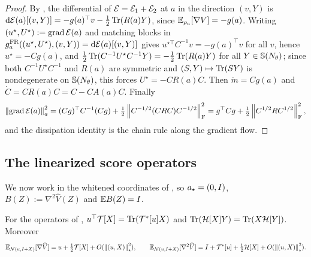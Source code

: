 \begin{proof}
By , the differential of $\mathcal{E}=\mathcal{E}_1+\mathcal{E}_2$ at $a$ in the direction
$(v,Y)$ is $\mathrm{d}\mathcal{E}(a)[(v,Y)]=-g(a)^\top v-\tfrac12\operatorname{Tr}(R(a)Y)$, since
$\mathbb{E}_{\rho_a}[\nabla V]=-g(a)$. Writing $(u^\star,U^\star):=\operatorname{grad}\mathcal{E}(a)$ and matching blocks in
$g_a^{\mathrm{FR}}((u^\star,U^\star),(v,Y))=\mathrm{d}\mathcal{E}(a)[(v,Y)]$ gives $u^{\star\top}C^{-1}v=-g(a)^\top v$
for all $v$, hence $u^\star=-Cg(a)$, and
$\tfrac12\operatorname{Tr}(C^{-1}U^\star C^{-1}Y)=-\tfrac12\operatorname{Tr}(R(a)Y)$ for all $Y\in\mathbb{S}(N_\theta)$; since
both $C^{-1}U^\star C^{-1}$ and $R(a)$ are symmetric and $(S,Y)\mapsto\operatorname{Tr}(SY)$ is nondegenerate
on $\mathbb{S}(N_\theta)$, this forces $U^\star=-CR(a)C$. Then $\dot m=Cg(a)$ and
$\dot C=CR(a)C=C-CA(a)C$. Finally
\[
    \left\lVert \operatorname{grad}\mathcal{E}(a)\right\rVert_a^2
    =(Cg)^\top C^{-1}(Cg)+\tfrac12\left\lVert C^{-1/2}(CRC)C^{-1/2}\right\rVert_{\mathrm{F}}^2
    =g^\top Cg+\tfrac12\left\lVert C^{1/2}RC^{1/2}\right\rVert_{\mathrm{F}}^2,
\]
and the dissipation identity is the chain rule along the gradient flow.
\end{proof}

\subsection{The linearized score operators}

We now work in the whitened coordinates of , so $a_\star=(0,I)$,
$B(Z):=\nabla^2\widehat V(Z)$ and $\mathbb{E} B(Z)=I$.

\begin{lemma}
\label{lem:adjoint-app}
For the operators of ,
$u^\top\mathcal T[X]=\operatorname{Tr}(\mathcal T^*[u]X)$ and $\operatorname{Tr}(\mathcal H[X]Y)=\operatorname{Tr}(X\mathcal H[Y])$.
Moreover
\[
    \mathbb{E}_{\mathcal{N}(u,I+X)}[\nabla\widehat V]=u+\tfrac12\mathcal T[X]+O(\left\lVert (u,X)\right\rVert_\star^2),
    \qquad
    \mathbb{E}_{\mathcal{N}(u,I+X)}[\nabla^2\widehat V]=I+\mathcal T^*[u]+\tfrac12\mathcal H[X]+O(\left\lVert (u,X)\right\rVert_\star^2).
\]
\end{lemma}

